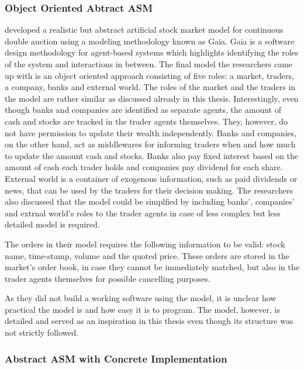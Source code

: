 \subsubsection{Object Oriented Abtract ASM}
\citet{Ben12} developed a realistic but abstract artificial stock market
model for continuous double auction using a modeling methodology known as 
Gaia. Gaia is a software design methodology for agent-based systems which 
highlights identifying the roles of the system and interactions in between.
The final model the researchers came up with is an object oriented 
approach consisting of five roles: a market, traders, a company, banks
and external world. The roles of the market and the traders in the model 
are rather similar as discussed already in this thesis. Interestingly,
even though banks and companies are identified as separate agents, 
the amount of cash and stocks are tracked in the trader agents themselves.
They, however, do not have permission to update their wealth independently. 
Banks and companies, on the other hand, act as middlewares for informing 
traders when and how much to update the amount cash and stocks. Banks also pay 
fixed interest based on the amount of cash each trader holds and companies 
pay dividend for each share. External world is a container of exogenous 
information, such as paid dividends or news, that can be used by the traders for 
their decision making. The researchers also discussed that the model could be
simplfied by including banks', companies' and extrnal world's roles to the
trader agents in case of less complex but less detailed model is required.

The orders in their model requires the following information to be valid:
stock name, time-stamp, volume and the quoted price. These orders are stored
in the market's order book, in case they cannot be immediately matched, but 
also in the trader agents themselves for possible cancelling purposes.


As they did not build a working software using the model, it is unclear
how practical the model is and how easy it is to program. The model, 
however, is detailed and served as an inspiration in this thesis even though
its structure was not strictly followed.


\subsubsection{Abstract ASM with Concrete Implementation}
